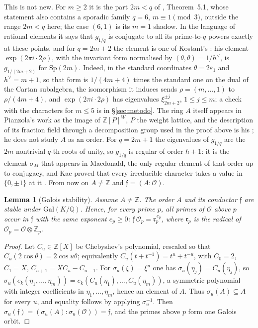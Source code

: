 \documentclass[11pt,a4paper]{article}
\newtheorem{lemma}[theorem]{Lemma}
\theoremstyle{definition}
\newcommand{\Sp}{\mathrm{Sp}}
\newcommand{\ZZ}{\mathbb{Z}}
\newcommand{\QQ}{\mathbb{Q}}
\newcommand{\cO}{\mathcal{O}}
\newcommand{\cf}{\mathfrak{f}}
\newcommand{\rad}{\mathfrak{r}}
\begin{document}
\noindent This is not new. For $m\ge2$ it is the part $2m<q$ of \cite{Mar26}, Theorem~5.1, whose
statement also contains a sporadic family $q=6$, $m\equiv1\pmod3$, outside the range $2m<q$ here; the
case $(6,1)$ is its $m=1$ shadow. In the language of rational elements it says that $g_{1/q}$ is conjugate
to all its prime-to-$q$ powers exactly at these points, and for $q=2m+2$ the element is one of Kostant's
\cite[Thm.~3.1]{Kostant76}: his element $\exp(2\pi i\cdot2\rho)$, with the invariant form normalised by
$(\theta,\theta)=1/h^\vee$, is $g_{1/(2m+2)}$ for $\Sp(2m)$. Indeed, in the standard coordinates $\theta=2\varepsilon_1$ and
$h^\vee=m+1$, so that form is $1/(4m+4)$ times the standard one on the dual of the Cartan subalgebra, the
isomorphism it induces sends $\rho=(m,\dots,1)$ to $\rho/(4m+4)$, and $\exp(2\pi i\cdot2\rho)$ has eigenvalues
$\xi_{2m+2}^{\pm j}$, $1\le j\le m$; a check with the characters for $m\le5$ is in \S\ref{sec:metodo}. The ring $A$
itself appears in Pianzola's work as the image of $\ZZ[P]^W$, $P$ the weight lattice, and the description of its fraction field through a
decomposition group used in the proof above is his \cite[Thm.~1 and Prop.~10]{Pia87}; he does not study $A$ as an
order. For
$q=2m+1$ the eigenvalues of $g_{1/q}$ are the $2m$ nontrivial $q$-th roots of unity, so $g_{1/q}$ is regular of
order $h+1$: it is the element $\sigma_M$ that appears in Macdonald, the only regular element of that order up to
conjugacy, and Kac proved that every irreducible character takes a value in $\{0,\pm1\}$ at it \cite[\S\S0--1]{Kac81}. From now on
$A\neq\ZZ$ and $\cf=(A:\cO)$.

\begin{lemma}[Galois stability]\label{lem:galois}
Assume $A\ne\ZZ$. The order $A$ and its conductor $\cf$ are stable under $\mathrm{Gal}(K/\QQ)$. Hence, for every prime $p$, all
primes of $\cO$ above $p$ occur in $\cf$ with the same exponent $e_p\ge0$: $\cf\,\cO_p=\rad_p^{\,e_p}$, where
$\rad_p$ is the radical of $\cO_p=\cO\otimes\ZZ_p$.
\end{lemma}

\begin{proof}
Let $C_u\in\ZZ[X]$ be Chebyshev's polynomial, rescaled so that $C_u(2\cos\theta)=2\cos u\theta$; equivalently
$C_u(t+t^{-1})=t^u+t^{-u}$, with $C_0=2$, $C_1=X$, $C_{u+1}=XC_u-C_{u-1}$. For $\sigma_u(\xi)=\xi^u$ one has $\sigma_u(\eta_j)=C_u(\eta_j)$, so
$\sigma_u(e_k(\eta_1,\dots,\eta_m))=e_k(C_u(\eta_1),\dots,C_u(\eta_m))$, a symmetric polynomial with integer
coefficients in $\eta_1,\dots,\eta_m$, hence an element of $A$. Thus $\sigma_u(A)\subseteq A$ for every $u$, and
equality follows by applying $\sigma_u^{-1}$. Then $\sigma_u(\cf)=(\sigma_u(A):\sigma_u(\cO))=\cf$, and the primes
above $p$ form one Galois orbit.
\end{proof}
\end{document}
